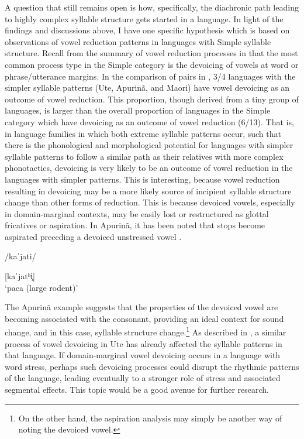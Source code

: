   A question that still remains open is how, specifically, the diachronic path leading to highly complex syllable structure gets started in a language. In light of the findings and discussions above, I have one specific hypothesis which is based on observations of vowel reduction patterns in languages with Simple syllable structure. Recall from the summary of vowel reduction processes in  that the most common process type in the Simple category is the devoicing of vowels at word or phrase/utterance margins. In the comparison of pairs in , 3/4 languages with the simpler syllable patterns (Ute, Apurinã, and Maori) have vowel devoicing as an outcome of vowel reduction. This proportion, though derived from a tiny group of languages, is larger than the overall proportion of languages in the Simple category which have devoicing as an outcome of vowel reduction (6/13). That is, in language families in which both extreme syllable patterns occur, such that there is the phonological and morphological potential for languages with simpler syllable patterns to follow a similar path as their relatives with more complex phonotactics, devoicing is very likely to be an outcome of vowel reduction in the languages with simpler patterns. This is interesting, because vowel reduction resulting in devoicing may be a more likely source of incipient syllable structure change than other forms of reduction. This is because devoiced vowels, especially in domain-marginal contexts, may be easily lost or restructured as glottal fricatives or aspiration. In Apurinã, it has been noted that stops become aspirated preceding a devoiced unstressed vowel .

\ea\label{ex:8.6}

/kaˈjati/

[kaˈjatʰi̥]\\
\glt ‘paca (large rodent)’
\citep[60--61]{Facundes2000} 
\z

  The Apurinã example suggests that the properties of the devoiced vowel are becoming associated with the consonant, providing an ideal context for sound change, and in this case, syllable structure change.\footnote{{On the other hand, the aspiration analysis may simply be another way of noting the devoiced vowel.}} As described in , a similar process of vowel devoicing in Ute has already affected the syllable patterns in that language. If domain-marginal vowel devoicing occurs in a language with word stress, perhaps such devoicing processes could disrupt the rhythmic patterns of the language, leading eventually to a stronger role of stress and associated segmental effects. This topic would be a good avenue for further research.


